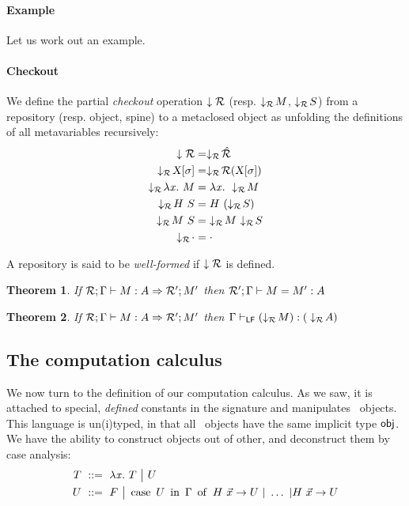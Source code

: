 \documentclass[9pt]{sigplanconf}
\newtheorem{theorem}{Theorem}
\begin{document}
\paragraph{Example}

Let us work out an example.

\paragraph{Checkout}

We define the partial \emph{checkout} operation $\downarrow{\mathcal{R}}$
(resp. $\downarrow_{\mathcal{R}}\!{M}$, $\downarrow_{\mathcal{R}}\!{S}$) from a repository
(resp. object, spine) to a metaclosed object as unfolding the
definitions of all metavariables recursively:
\begin{align*}
  \checkout{\mr} &= \checkoutr{\hat{\mr}} \\
  \checkoutr{\smeta X \sigma} &= \checkoutr{\mr(\smeta X\sigma)}\\
  \checkoutr{\lam x M} &= \lam x \checkoutr{M} \\
  \checkoutr{\app H S} &= \app H {(\checkoutr{S})} \\
  \checkoutr{\spinecons M S} &= \spinecons {\checkoutr M} {\checkoutr S} \\
  \checkoutr{\spinenil} &= \spinenil
\end{align*}

A repository is said to be \emph{well-formed} if $\downarrow{\mathcal{R}}$
is defined.

\begin{theorem}
  If \/ ${{\mathcal{R}}; {\Gamma}}\vdash{{{{M}: {A}}}\Rightarrow{{\mathcal{R'}}; {M'}}}$ then \/ ${{\mathcal{R'}}; {\Gamma}}\vdash{{M}={M'}:{A}}$
\end{theorem}

\begin{theorem}
  If \/ ${{\mathcal{R}}; {\Gamma}}\vdash{{{{M}: {A}}}\Rightarrow{{\mathcal{R'}}; {M'}}}$ then \/ ${\Gamma}\vdash_{\text{\rm\sf{LF}}}{{(\downarrow_{\mathcal{R}}\!{M})}:{(}}\downarrow_{\mathcal{R}}\!{A})$
\end{theorem}

\subsection{The computation calculus}
\label{sec:computational-calculus}

We now turn to the definition of our computation calculus. As we saw,
it is attached to special, \emph{defined} constants in the signature
and manipulates \LF\ objects. This language is un(i)typed, in that all
\LF\ objects have the same implicit type $\text{\textsf{obj}}$. We have the
ability to construct objects out of other, and deconstruct them by
case analysis:
\begin{align*}
  T &\ ::=\ 
  \lambda{\ensuremath{\text{\textit{x}}}}.\  T \ {\big|}\ 
  U \\
  U &\ ::=\ 
  F \ {\big|}\ 
  \operatorname{case}\ {{U}\ \operatorname{in}\ {\Gamma}}\ \operatorname{of}\  {{H}\  {\vec x}}\to U\ |\ \ldots\
  |{{H}\  {\vec x}}\to U
\end{align*}
\end{document}
